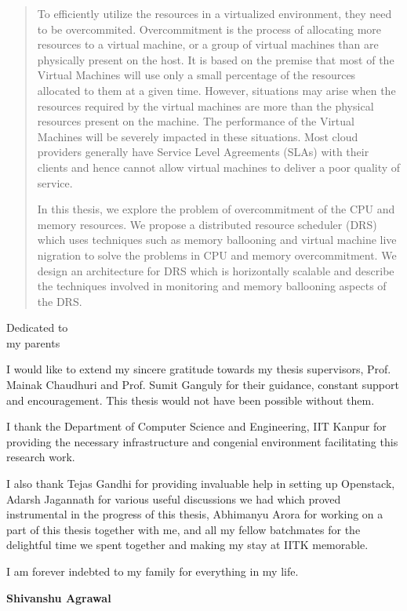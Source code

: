 \begin{abstract}
  To efficiently utilize the resources in a virtualized environment, they need to be overcommited. Overcommitment is the process of allocating more resources to a virtual machine, or a group of virtual machines than are physically present on the host. It is based on the premise that most of the Virtual Machines will use only a small percentage of the resources allocated to them at a given time. However, situations may arise when the resources required by the virtual machines are more than the physical resources present on the machine. The performance of the Virtual Machines will be severely impacted in these situations. Most cloud providers generally have Service Level Agreements (SLAs) with their clients and hence cannot allow virtual machines to deliver a poor quality of service.

In this thesis, we explore the problem of overcommitment of the CPU and memory resources. We propose a distributed resource scheduler (DRS) which uses techniques such as memory ballooning and virtual machine live nigration to solve the problems in CPU and memory overcommitment. We design an architecture for DRS which is horizontally scalable and describe the techniques involved in monitoring and memory ballooning aspects of the DRS.

\end{abstract}

\begin{dedication}
Dedicated to\\
my parents
\end{dedication}

\begin{acknowledgments}
I would like to extend my sincere gratitude towards my thesis supervisors, Prof. Mainak Chaudhuri and Prof. Sumit Ganguly for their guidance, constant support and encouragement. This thesis would not have been possible without them.

I thank the Department of Computer Science and Engineering, IIT Kanpur for providing the necessary infrastructure and congenial environment facilitating this research work.

I also thank Tejas Gandhi for providing invaluable help in setting up Openstack, Adarsh Jagannath for various useful discussions we had which proved instrumental in the progress of this thesis, Abhimanyu Arora  for working on a part of this thesis together with me, and all my fellow batchmates for the delightful time we spent together and making my stay at IITK memorable.

I am forever indebted to my family for everything in my life.

\hfill \hfill \textbf{Shivanshu Agrawal}
\end{acknowledgments}

